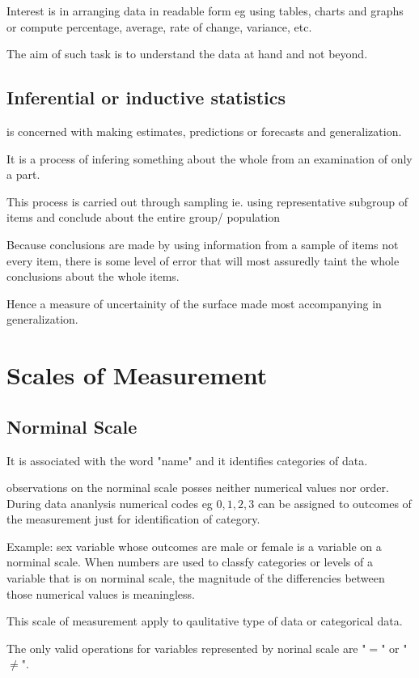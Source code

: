 \documentclass[12pt]{article}
\begin{document}
Interest is in arranging data in readable form eg using tables, charts and graphs or compute percentage, average, rate of change, variance, etc.

The aim of such task is to understand the data at hand and not beyond.

\subsection{Inferential or inductive statistics}is concerned with making estimates, predictions or forecasts and generalization.

It is  a process of infering something about the whole from an examination of only a part.

This process is carried out through sampling ie. using representative subgroup of items and conclude about the entire group/ population

Because conclusions are made by using information from a sample of items not every item, there is some level of error that will most assuredly taint the whole conclusions about the whole items.

Hence a measure of uncertainity of the surface made most accompanying in generalization.


\section{Scales of Measurement}

\subsection{Norminal Scale}
It is associated with the word "name" and it identifies categories of data.

observations on the norminal scale posses neither numerical values nor order.
During data ananlysis numerical codes eg $0, 1, 2, 3$ can be assigned to outcomes of the measurement just for identification of category.

Example: sex variable whose outcomes are male or female is a variable on a norminal scale.
When numbers are used to classfy categories or levels of a variable that is on norminal scale, the magnitude of the differencies between those numerical values is meaningless.

This scale of measurement apply to qaulitative type of data or categorical data.

The only valid operations for variables represented by norinal scale are "$=$" or "$\neq$".
\end{document}
